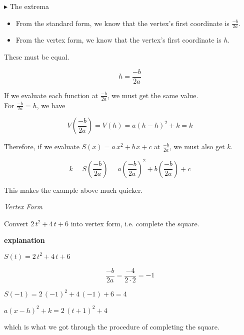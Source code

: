 \documentclass{ximera}
\begin{document}
\textbf{\textcolor{blue!55!black}{$\blacktriangleright$}}  The extrema \\



\begin{itemize}
\item From the standard form, we know that the vertex's first coordinate is $\frac{-b}{2 a}$.
\item From the vertex form, we know that the vertex's first coordinate is $h$.
\end{itemize}


These must be equal.

\[
h = \frac{-b}{2 a}
\]



If we evaluate each function at $\frac{-b}{2 a}$, we must get the same value.  \\

For $\frac{-b}{2 a}  = h$, we have 

\[
V\left( \frac{-b}{2 a} \right) = V(h) = a (h - h)^2 + k = k
\]

Therefore, if we evaluate $S(x) = a \, x^2 + b \, x + c$ at $\frac{-b}{2 a}$, we must also get $k$.



\[
k = S\left( \frac{-b}{2 a} \right) = a \left( \frac{-b}{2 a} \right)^2 + b \left( \frac{-b}{2 a} \right) + c 
\]







This makes the example above much quicker.





\begin{example} \textit{Vertex Form}



Convert $2 \, t^2 + 4 \, t + 6$ into vertex form, i.e. complete the square.


\textbf{explanation}


$S(t) = 2 \, t^2 + 4 \, t + 6$


\[
\frac{-b}{2 a} = \frac{-4}{2 \cdot 2} = -1
\]


$S(-1) = 2 \, (-1)^2 + 4 \, (-1) + 6 = 4$



$a (x - h)^2 + k = 2 \, (t+1)^2 + 4$

which is what we got through the procedure of completing the square.





\end{example}
\end{document}
